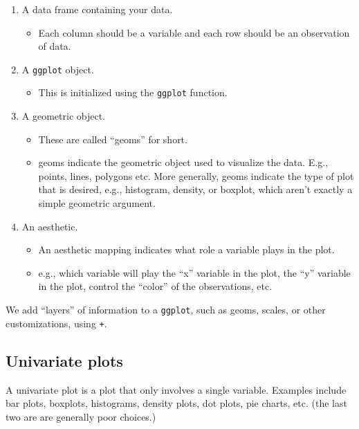 \documentclass[
]{book}
\providecommand{\tightlist}{%
  \setlength{\itemsep}{0pt}\setlength{\parskip}{0pt}}
\theoremstyle{definition}
\theoremstyle{definition}
\theoremstyle{definition}
\theoremstyle{definition}
\theoremstyle{remark}
\begin{document}
\begin{enumerate}
\def\labelenumi{\arabic{enumi}.}
\tightlist
\item
  A data frame containing your data.

  \begin{itemize}
  \tightlist
  \item
    Each column should be a variable and each row should be an observation of data.
  \end{itemize}
\item
  A \texttt{ggplot} object.

  \begin{itemize}
  \tightlist
  \item
    This is initialized using the \texttt{ggplot} function.
  \end{itemize}
\item
  A geometric object.

  \begin{itemize}
  \tightlist
  \item
    These are called ``geoms'' for short.
  \item
    geoms indicate the geometric object used to visualize the data. E.g., points, lines, polygons etc. More generally, geoms indicate the type of plot that is desired, e.g., histogram, density, or boxplot, which aren't exactly a simple geometric argument.
  \end{itemize}
\item
  An aesthetic.

  \begin{itemize}
  \tightlist
  \item
    An aesthetic mapping indicates what role a variable plays in the plot.
  \item
    e.g., which variable will play the ``x'' variable in the plot, the ``y'' variable in the plot, control the ``color'' of the observations, etc.
  \end{itemize}
\end{enumerate}

We add ``layers'' of information to a \texttt{ggplot}, such as geoms, scales, or other customizations, using \texttt{+}.

\hypertarget{univariate-plots}{%
\subsection{Univariate plots}\label{univariate-plots}}

A univariate plot is a plot that only involves a single variable. Examples include bar plots, boxplots, histograms, density plots, dot plots, pie charts, etc. (the last two are are generally poor choices.)
\end{document}
